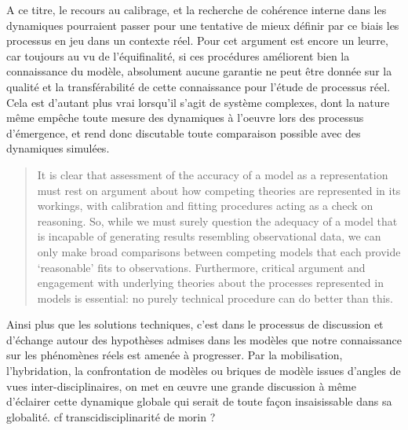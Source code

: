 A ce titre, le recours au calibrage, et la recherche de cohérence interne dans les dynamiques pourraient passer pour une tentative de mieux définir par ce biais les processus en jeu dans un contexte réel. Pour \autocite{OSullivan2004} cet argument est encore un leurre, car toujours au vu de l'équifinalité, si ces procédures améliorent bien la connaissance du modèle, absolument aucune garantie ne peut être donnée sur la qualité et la transférabilité de cette connaissance pour l'étude de processus réel. Cela est d'autant plus vrai lorsqu'il s'agit de système complexes, dont la nature même empêche toute  mesure des dynamiques à l'oeuvre lors des processus d'émergence, et rend donc discutable toute comparaison possible avec des dynamiques simulées. 

\begin{quotation} It is clear that assessment of the accuracy of a model as a representation must rest on argument about how competing theories are represented in its workings, with calibration and fitting procedures acting as a check on reasoning. So, while we must surely question the adequacy of a model that is incapable of generating results resembling observational data, we can only make broad comparisons between competing models that each provide ‘reasonable’ fits to observations. Furthermore, critical argument and engagement with underlying theories about the processes represented in models is essential: no purely technical procedure can do better than this.  \\  \end{quotation}


Ainsi plus que les solutions techniques, c'est dans le processus de discussion et d'échange autour des hypothèses admises dans les modèles que notre connaissance sur les phénomènes réels est amenée à progresser. Par la mobilisation, l'hybridation, la confrontation de modèles ou briques de modèle issues d'angles de vues inter-disciplinaires,  on met en œuvre une grande discussion à même d'éclairer cette dynamique globale qui serait de toute façon insaisissable dans sa globalité. {cf transcidisciplinarité de morin ?}
 
